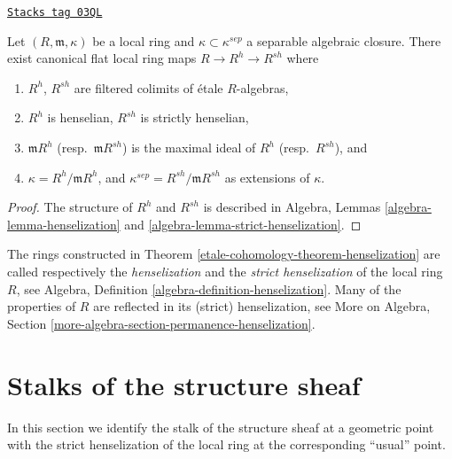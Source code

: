 \begin{theorem}[Henselization]
\label{etale-cohomology-theorem-henselization}
\href{https://stacks.math.columbia.edu/tag/03QL}{\texttt{Stacks tag 03QL}}

Let $(R, \mathfrak m, \kappa)$ be a local ring and
$\kappa\subset\kappa^{sep}$ a separable algebraic closure.
There exist canonical flat local ring maps $R \to R^h \to R^{sh}$ where
\begin{enumerate}
\item $R^h$, $R^{sh}$ are filtered colimits of \'etale $R$-algebras,
\item $R^h$ is henselian, $R^{sh}$ is strictly henselian,
\item $\mathfrak m R^h$ (resp.\ $\mathfrak m R^{sh}$) is the
maximal ideal of $R^h$ (resp.\ $R^{sh}$), and
\item $\kappa = R^h/\mathfrak m R^h$, and
$\kappa^{sep} = R^{sh}/\mathfrak m R^{sh}$ as extensions of $\kappa$.
\end{enumerate}
\end{theorem}

\begin{proof}
The structure of $R^h$ and $R^{sh}$ is described in
Algebra, Lemmas \ref{algebra-lemma-henselization} and
\ref{algebra-lemma-strict-henselization}.
\end{proof}

The rings constructed in Theorem \ref{etale-cohomology-theorem-henselization}
are called respectively the {\it henselization} and the
{\it strict henselization} of the local ring $R$, see
Algebra, Definition \ref{algebra-definition-henselization}.
Many of the properties of $R$ are reflected in its (strict) henselization,
see More on Algebra,
Section \ref{more-algebra-section-permanence-henselization}.

\section{Stalks of the structure sheaf}
\label{etale-cohomology-section-stalks-structure-sheaf}
In this section we identify the stalk of the structure sheaf at a geometric
point with the strict henselization of the local ring at the corresponding
``usual'' point.

